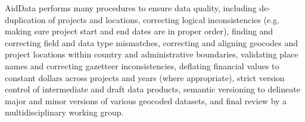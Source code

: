 AidData performs many procedures to ensure data quality, including de-duplication of projects and locations, correcting logical inconsistencies (e.g. making sure project start and end dates are in proper order), finding and correcting field and data type mismatches, correcting and aligning geocodes and project locations within country and administrative boundaries, validating place names and correcting gazetteer inconsistencies, deflating financial values to constant dollars across projects and years (where appropriate), strict version control of intermediate and draft data products, semantic versioning to delineate major and minor versions of various geocoded datasets, and final review by a multidisciplinary working group. 
